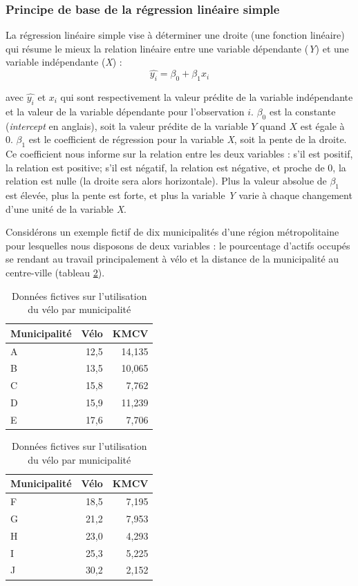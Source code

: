 \documentclass[
  11pt,
  french,
]{book}
\begin{document}
\hypertarget{sect04141}{%
\subsubsection{Principe de base de la régression linéaire simple}\label{sect04141}}

La régression linéaire simple vise à déterminer une droite (une fonction linéaire) qui résume le mieux la relation linéaire entre une variable dépendante (\emph{Y}) et une variable indépendante (\emph{X}) :
\begin{equation} 
\widehat{y_i} = \beta_{0} + \beta_{1}x_{i}
\label{eq:regsimple}
\end{equation}

avec \(\widehat{y_i}\) et \(x_{i}\) qui sont respectivement la valeur prédite de la variable indépendante et la valeur de la variable dépendante pour l'observation \(i\). \(\beta_{0}\) est la constante (\emph{intercept} en anglais), soit la valeur prédite de la variable \(Y\) quand \(X\) est égale à 0. \(\beta_{1}\) est le coefficient de régression pour la variable \emph{X}, soit la pente de la droite. Ce coefficient nous informe sur la relation entre les deux variables : s'il est positif, la relation est positive; s'il est négatif, la relation est négative, et proche de 0, la relation est nulle (la droite sera alors horizontale). Plus la valeur absolue de \(\beta_{1}\) est élevée, plus la pente est forte, et plus la variable \emph{Y} varie à chaque changement d'une unité de la variable \emph{X}.

Considérons un exemple fictif de dix municipalités d'une région métropolitaine pour lesquelles nous disposons de deux variables : le pourcentage d'actifs occupés se rendant au travail principalement à vélo et la distance de la municipalité au centre-ville (tableau \ref{tab:regfictives}).

\begin{table}
\caption{\label{tab:regfictives}Données fictives sur l'utilisation du vélo par municipalité}

\centering
\fontsize{8}{10}\selectfont
\begin{tabular}[t]{lrr}
\toprule
Municipalité & Vélo & KMCV\\
\midrule
A & 12,5 & 14,135\\
B & 13,5 & 10,065\\
C & 15,8 & 7,762\\
D & 15,9 & 11,239\\
E & 17,6 & 7,706\\
\bottomrule
\end{tabular}
\centering
\begin{tabular}[t]{lrr}
\toprule
Municipalité & Vélo & KMCV\\
\midrule
F & 18,5 & 7,195\\
G & 21,2 & 7,953\\
H & 23,0 & 4,293\\
I & 25,3 & 5,225\\
J & 30,2 & 2,152\\
\bottomrule
\end{tabular}
\end{table}
\end{document}
